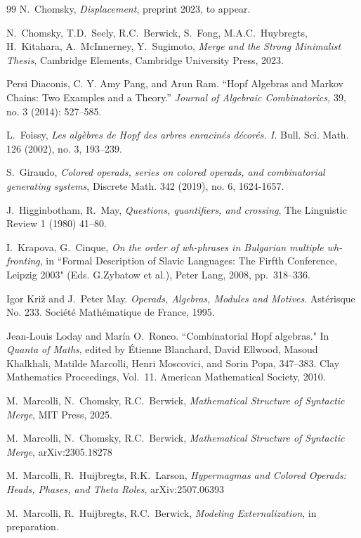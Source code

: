 \documentclass[12pt]{amsart}
\numberwithin{equation}{section}
\begin{document}
\begin{thebibliography}{99}
 N.~Chomsky, {\em Displacement}, preprint 2023, to appear.

 N.~Chomsky, T.D.~Seely, R.C.~Berwick, S.~Fong, M.A.C.~Huybregts, H.~Kitahara, A.~McInnerney, Y.~Sugimoto, {\em Merge and the Strong Minimalist Thesis}, Cambridge
Elements, Cambridge University Press, 2023.

 Persi Diaconis, C. Y. Amy Pang, and Arun Ram. ``Hopf Algebras and Markov Chains: Two Examples and a Theory.” {\em Journal of Algebraic Combinatorics,} 39, no. 3 (2014): 527--585.

 L.~Foissy, {\em Les alg\`ebres de Hopf des arbres enracin\'es d\'ecor\'es. I.} 
Bull. Sci. Math. 126 (2002), no. 3, 193--239.

 S.~Giraudo, {\em Colored operads, series on colored operads, and combinatorial generating systems}, Discrete Math. 342 (2019), no. 6, 1624-1657.

 J.~Higginbotham, R.~May, {\em Questions, quantifiers, and crossing}, The Linguistic Review 1 (1980) 41--80.

 I.~Krapova, G.~Cinque, {\em On the order of wh-phrases in Bulgarian multiple wh-fronting}, in ``Formal
Description of Slavic Languages: The Firfth Conference, Leipzig 2003" (Eds. G.Zybatow et al.), Peter Lang, 2008, pp.~318--336.

 Igor Kri\v{z} and J.~Peter May. {\em  Operads, Algebras, Modules and Motives}. Ast\'erisque No. 233. 
Soci\'et\'e Math\'ematique de France, 1995.

 Jean-Louis Loday and Mar\'ia O.~Ronco. 
``Combinatorial Hopf algebras." In {\em Quanta of Maths}, 
edited by \'Etienne Blanchard, David Ellwood, Masoud Khalkhali, Matilde Marcolli, Henri Moscovici, and Sorin Popa, 
347--383. 
Clay Mathematics Proceedings, Vol.~11.
American Mathematical Society, 2010. 

 M.~Marcolli, N.~Chomsky, R.C.~Berwick, {\em Mathematical Structure of Syntactic Merge},
MIT Press, 2025.

 M.~Marcolli, N.~Chomsky, R.C.~Berwick, {\em Mathematical Structure of Syntactic Merge}, arXiv:2305.18278 

 M.~Marcolli, R.~Huijbregts, R.K.~Larson, {\em Hypermagmas and Colored Operads: Heads, Phases, and Theta Roles}, arXiv:2507.06393

 M.~Marcolli, R.~Huijbregts, R.C.~Berwick, {\em  Modeling Externalization}, in preparation.


\end{thebibliography}
\end{document}

